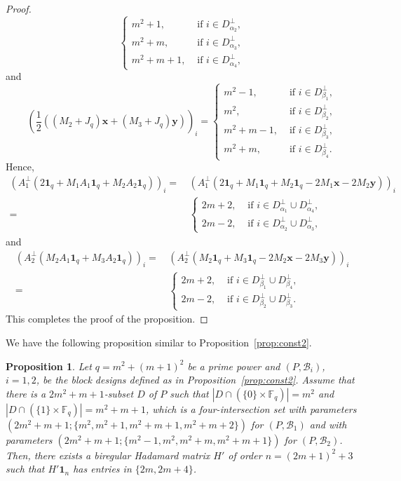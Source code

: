 \documentclass[10pt]{amsart}
\newtheorem{prop}[theo]{Proposition}
\theoremstyle{definition}
\newcommand*\F{{\mathbb F}}
\newcommand*{\un}{\mathbf{1}}
\newcommand*{\bfx}{\mathbf{x}}
\newcommand*{\bfy}{\mathbf{y}}
\begin{document}
\begin{proof}
\[\begin{cases}
m^2+1,& \text{ if } i\in D_{\alpha_2}^\perp,\\
m^2+m,& \text{ if } i\in D_{\alpha_3}^\perp, \\
m^2+m+1,& \text{ if } i\in D_{\alpha_4}^\perp,
\end{cases}
\]
and
\[
\left(\frac{1}{2}((M_2+J_q)\bfx+(M_3+J_q)\bfy)\right)_i=
\begin{cases}
m^2-1,& \text{ if } i\in D_{\beta_1}^\perp,\\
m^2,& \text{ if } i\in D_{\beta_2}^\perp,\\
m^2+m-1,& \text{ if } i\in D_{\beta_3}^\perp, \\
m^2+m,& \text{ if } i\in D_{\beta_4}^\perp.
\end{cases}
\]
Hence,
\begin{align*}
\left(A_1^\perp (2\un_q+M_1A_1\un_q+M_2A_2\un_q)\right)_i=&\,
\left(A_1^\perp (2\un_q+M_1\un_q+M_2\un_q-2M_1\bfx-2M_2\bfy)\right)_i\\
=&\,
\begin{cases}
2m+2,& \text{ if } i\in D_{\alpha_1}^\perp \cup D_{\alpha_4}^\perp,\\
2m-2,& \text{ if } i\in D_{\alpha_2}^\perp \cup D_{\alpha_3}^\perp,
\end{cases}
\end{align*}
and
\begin{align*}
\left(A_2^\perp (M_2A_1\un_q+M_3A_2\un_q)\right)_i=&\,
\left(A_2^\perp (M_2\un_q+M_3\un_q-2M_2\bfx-2M_3\bfy)\right)_i\\
=&\,
\begin{cases}
2m+2,& \text{ if } i\in D_{\beta_1}^\perp \cup D_{\beta_4}^\perp,\\
2m-2,& \text{ if } i\in D_{\beta_2}^\perp \cup D_{\beta_3}^\perp.
\end{cases}
\end{align*}
This completes the proof of the proposition.
\end{proof}

We have the following proposition similar to Proposition~\ref{prop:const2}.

\begin{prop}\label{prop:const3}
Let $q=m^2+(m+1)^2$ be a prime power and $(P,{\mathcal B}_i)$, $i=1,2$, be the block designs defined as in Proposition~\ref{prop:const2}. Assume that there is a $2m^2+m+1$-subset $D$ of $P$ such that $|D\cap (\{0\}\times \F_q)|=m^2$ and $|D\cap (\{1\}\times \F_q)|=m^2+m+1$, which is a four-intersection set with parameters $(2m^2+m+1;\{m^2,m^2+1,m^2+m+1,m^2+m+2\})$ for $(P,{\mathcal B}_1)$ and with parameters $(2m^2+m+1;\{m^2-1,m^2,m^2+m,m^2+m+1\})$ for $(P,{\mathcal B}_2)$. Then, there exists a biregular Hadamard matrix $H'$ of order $n=(2m+1)^2+3$ such that $H'\un_{n}$ has entries in $\{2m,2m+4\}$.
\end{prop}
\end{document}
